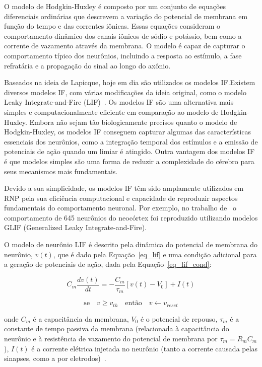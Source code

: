 O modelo de Hodgkin-Huxley é composto por um conjunto de equações diferenciais ordinárias que descrevem a variação do potencial de
membrana em função do tempo e das correntes iônicas. Essas equações consideram o comportamento dinâmico dos canais iônicos de
sódio e potássio, bem como a corrente de vazamento através da membrana. O modelo é capaz de capturar o comportamento típico dos
neurônios, incluindo a resposta ao estímulo, a fase refratária e a propagação do sinal ao longo do axônio.

Baseados na ideia de Lapicque, hoje em dia são utilizados os modelos IF.\@ Existem diversos modelos IF, com
várias modificações da ideia original, como o modelo Leaky Integrate-and-Fire (LIF)~\cite{burkittReview2006}. Os modelos IF são
uma alternativa mais simples e computacionalmente eficiente em comparação ao modelo de Hodgkin-Huxley. Embora não sejam tão
biologicamente precisos quanto o modelo de Hodgkin-Huxley, os modelos IF conseguem capturar algumas das características essenciais
dos neurônios, como a integração temporal dos estímulos e a emissão de potenciais de ação quando um limiar é atingido. Outra
vantagem dos modelos IF é que modelos simples são uma forma de reduzir a complexidade do cérebro para seus mecanismos mais
fundamentais.

Devido a sua simplicidade, os modelos IF têm sido amplamente utilizados em RNP pela sua eficiência computacional e capacidade de
reproduzir aspectos fundamentais do comportamento neuronal. Por exemplo, no trabalho de~ o
comportamento de 645 neurônios do neocórtex foi reproduzido utilizando modelos GLIF (Generalized Leaky Integrate-and-Fire). 

O modelo de neurônio LIF é descrito pela dinâmica do potencial de membrana do neurônio, $v(t)$, que é dado pela
Equação~\ref{eq_lif} e uma condição adicional para a geração de potenciais de ação, dada pela Equação~\ref{eq_lif_cond}:

\begin{equation}
\label{eq_lif}
C_m \frac{dv(t)}{dt} = -\frac{C_m}{\tau_m} [v(t) - V_0] + I(t)
\end{equation}

\begin{equation}
\label{eq_lif_cond}
\text{se}\quad v \ge v_{th} \quad \text{então} \quad v \gets v_{reset}
\end{equation}

\noindent{}onde $C_m$ é a capacitância da membrana, $V_0$ é o potencial de repouso, $\tau_m$ é a constante de tempo passiva da membrana
(relacionada à capacitância do neurônio e à resistência de vazamento do potencial de membrana por $\tau_m = R_m C_m$), $I(t)$ é a
corrente elétrica injetada no neurônio (tanto a corrente causada pelas sinapses, como a por eletrodos)~\cite{burkittReview2006}. 

